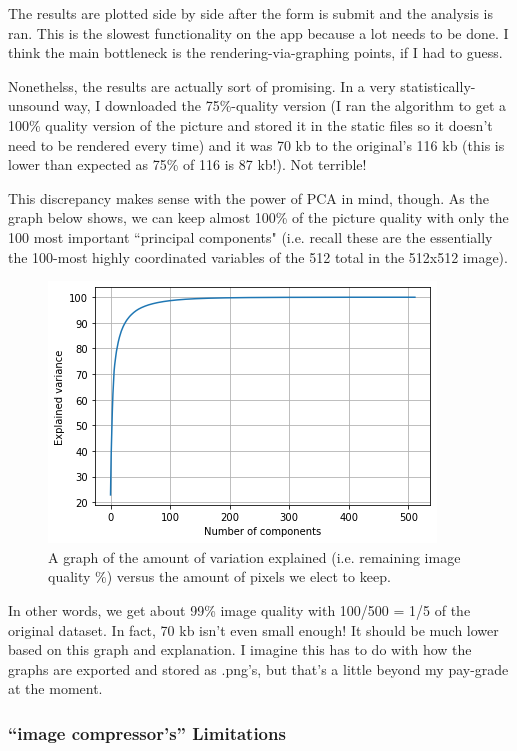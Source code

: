 \documentclass[10pt]{article}
\begin{document}
\begin{multicols*}{2}
The results are plotted side by side after the form is submit and the analysis is ran. This is the slowest functionality on the app because a lot needs to be done. I think the main bottleneck is the rendering-via-graphing points, if I had to guess. 

Nonethelss, the results are actually sort of promising. In a very statistically-unsound way, I downloaded the 75\%-quality version (I ran the algorithm to get a 100\% quality version of the picture and stored it in the static files so it doesn't need to be rendered every time) and it was 70 kb to the original's 116 kb (this is lower than expected as 75\% of 116 is 87 kb!). Not terrible!

This discrepancy makes sense with the power of PCA in mind, though. As the graph below shows, we can keep almost 100\% of the picture quality with only the 100 most important ``principal components" (i.e. recall these are the essentially the 100-most highly coordinated variables of the 512 total in the 512x512 image). 

\begin{figure}[H]
    \centering
	\includegraphics[width=.75\columnwidth]{pca.png}
	\caption{A graph of the amount of variation explained (i.e. remaining image quality \%) versus the amount of pixels we elect to keep.}
	\label{fig:fig6}
\end{figure}

In other words, we get about 99\% image quality with 100/500 = 1/5 of the original dataset. In fact, 70 kb isn't even small enough! It should be much lower based on this graph and explanation. I imagine this has to do with how the graphs are exported and stored as .png's, but that's a little beyond my pay-grade at the moment.



\subsubsection{``image compressor's'' Limitations}


\end{multicols*}
\end{document}

